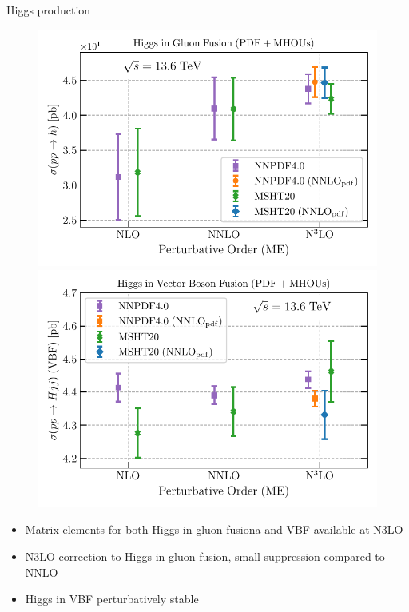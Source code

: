 \documentclass[8pt,t]{beamer}
\begin{document}
\begin{frame}{Higgs production}
  \begin{figure}[!t]
    \centering
    \includegraphics[width=0.49\linewidth]{figures/higgs-ggF-n3lo.pdf}
    \includegraphics[width=0.49\linewidth]{figures/H_VBF-n3lo.pdf}
  \end{figure}
  \begin{itemize}
    \item Matrix elements for both Higgs in gluon fusiona and VBF available at N3LO
    \item N3LO correction to Higgs in gluon fusion, small suppression compared to NNLO
    \item Higgs in VBF perturbatively stable
  \end{itemize}
\end{frame}
\end{document}
